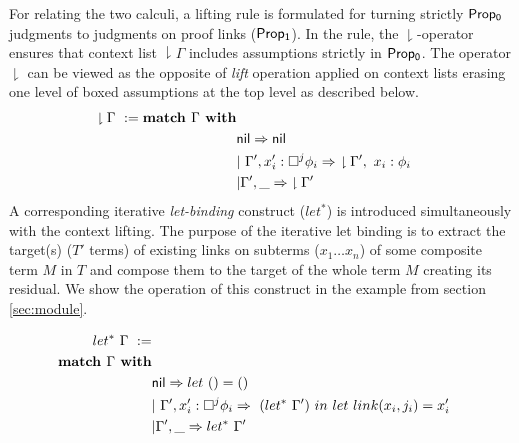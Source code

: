 \documentclass[11pt]{entcs}
\newcommand{\TurnTT}[2]
	{ \Delta_0;{#1}\vdash_{\sf JC_1}  {#2}}
\begin{document}
%
For relating the two calculi, a lifting rule is formulated for turning strictly ${\sf Prop_0}$ judgments to judgments on proof links (${\sf Prop_1}$). In the rule,  the $\downharpoonright$-operator ensures that  context list $\downharpoonright\Gamma$ includes assumptions strictly in ${\sf Prop_0}$. 
The operator $\downharpoonright$ can be viewed as the opposite of \textit{lift} operation applied on context lists  erasing one level of boxed assumptions at the top level as described below.
 \begin{align}
\nonumber \downharpoonright\Gamma\  :=\textbf{match $\Gamma $\ with} \\
&\nonumber   {\sf nil} \Rightarrow {\sf  nil}\\
&\nonumber|\ \Gamma', x_i^{\prime}:\Box^{j} \phi_i\Rightarrow\ \downharpoonright \Gamma' ,\  x_i:\phi_i\\
&\nonumber|{\Gamma',\_}\Rightarrow {\downharpoonright\Gamma'} 
\end{align}
A corresponding iterative \textit{let-binding} construct ($let^{*}$) is introduced simultaneously with the context lifting. The purpose of the iterative let binding is to extract the target(s) ($T'$ terms) of existing links on subterms ($x_1\ldots x_n$) of some composite term $M$ in $T$ and compose them to the target of the whole term $M$ creating its residual. We show the operation of this construct in the example from section \ref{sec:module}.
 
\begin{align}
\nonumber let^{*}\ \Gamma\  :=\\ 
\nonumber\textbf{match $\Gamma $\ with} \\
&\nonumber   {\sf nil} \Rightarrow {let\  ()= ()}\\
&\nonumber|\ \Gamma', x_i^{\prime}:\Box^{j} \phi_i\Rightarrow\ (let^{*}\ \Gamma')  \ in\  let \ link  (x_i,j_i)=x_i^{\prime}\\
&\nonumber|{\Gamma',\_}\Rightarrow {let^{*}\ \Gamma'} 
\end{align}
\end{document}
